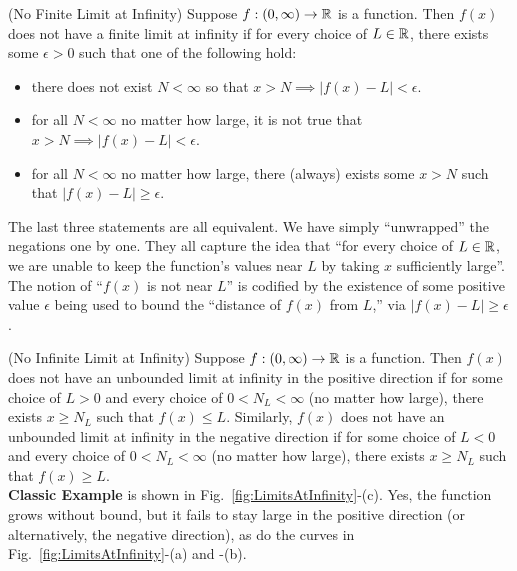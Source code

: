 \begin{tcolorbox}[colback=mylightblue, title = {\bf Neither Finite nor Infinite Limit at $\infty$ Exists}, breakable]
\begin{definition}
\label{def:NoFiniteLimitAtInfinity}
(No Finite Limit at Infinity) Suppose $f:(0, \infty) \to \mathbb R$ is a function. Then $f(x)$ does not have a finite limit at infinity if for every choice of $L \in \mathbb R$, there exists some $\epsilon>0$ such that one of the following hold:
    \begin{itemize}
        \item  there does not exist $N < \infty$ so that $x > N \implies |f(x)-L| < \epsilon$.
     \item  for all $N < \infty$ no matter how large, it is not true that $x > N \implies |f(x)-L| < \epsilon$.
    \item  for all $N < \infty$ no matter how large, there (always) exists some $x > N$ such that $|f(x)-L| \ge \epsilon$.
    \end{itemize}
\end{definition}

The last three statements are all equivalent. We have simply ``unwrapped'' the negations one by one. They all capture the idea that ``for every choice of $L \in \mathbb R$, we are unable to keep the function's values near $L$ by taking $x$ sufficiently large''. The notion of ``$f(x)$ is not near $L$'' is codified by the existence of some positive value $\epsilon$ being used to bound the ``distance of $f(x)$ from $L$,'' via $|f(x)-L| \ge \epsilon$. \\

\begin{definition}
\label{def:InfiniteLimitAtInfinity}
(No Infinite Limit at Infinity) Suppose $f:(0, \infty) \to \mathbb R$ is a function. Then $f(x)$ does not have an unbounded limit at infinity in the positive direction if for some choice of $L >0 $ and every choice of $0< N_L < \infty$ (no matter how large), there exists $x \ge N_L$ such that $f(x) \le L$. Similarly, $f(x)$ does not have an unbounded limit at infinity in the negative direction if for some choice of $L < 0 $ and every choice of $0< N_L < \infty$ (no matter how large), there exists $x \ge N_L$ such that $f(x) \ge L$.\\

\textbf{Classic Example} is shown in Fig.~\ref{fig:LimitsAtInfinity}-(c). Yes, the function grows without bound, but it fails to stay large in the positive direction (or alternatively, the negative direction), as do the curves in Fig.~\ref{fig:LimitsAtInfinity}-(a) and -(b). 
    

\end{definition}
    
 
\end{tcolorbox}


